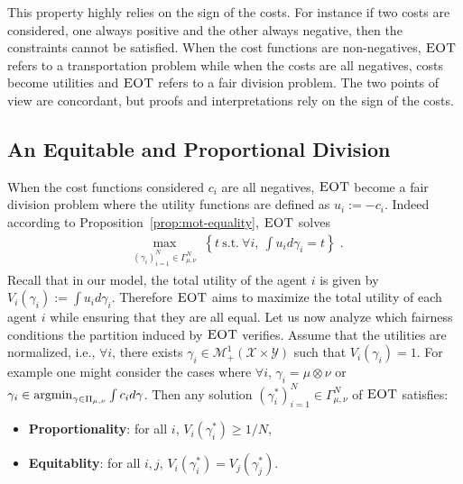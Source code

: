 This property highly relies on the sign of the costs. For instance if two costs are considered, one always positive and the other always negative, then the constraints cannot be satisfied. When the cost functions are non-negatives, $\textsc{EOT}$ refers to a transportation problem while when the costs are all negatives, costs become utilities and $\textsc{EOT}$ refers to a fair division problem. The two points of view are concordant, but proofs and interpretations rely on the sign of the costs.

\subsection{An Equitable and Proportional Division } 
When the cost functions considered $c_i$ are all negatives, $\textsc{EOT}$ become a fair division problem where the utility functions are defined as $u_i:=-c_i$. Indeed according to Proposition~\ref{prop:mot-equality}, $\textsc{EOT}$ solves
\begin{align*}
\max_{\substack{(\gamma_i)_{i=1}^N\in\Gamma^N_{\mu,\nu}
}}   \left\{t~\mathrm{s.t.}~ \forall i,~\int u_i d\gamma_i=t\right\}\; .
\end{align*}
Recall that in our model, the total utility of the agent $i$ is given by $V_i(\gamma_i):=\int u_i d\gamma_i$. Therefore $\textsc{EOT}$ aims to maximize the total utility of each agent $i$ while ensuring that they are all equal. Let us now analyze which fairness conditions the partition induced by $\textsc{EOT}$ verifies. Assume that the utilities are normalized, i.e., $\forall i$, there exists $\gamma_i\in\mathcal{M}_+^1(\mathcal{X}\times\mathcal{Y})$ such that $V_i(\gamma_i)=1$. For example one might consider the cases where $\forall i$,  $\gamma_i=\mu\otimes\nu$ or $\gamma_i\in\operatorname*{argmin}_{\gamma\in\Pi_{\mu,\nu}}  \int c_i d\gamma$. Then any solution $(\gamma_i^{*})_{i=1}^N\in\Gamma^N_{\mu,\nu}$ of $\textsc{EOT}$ satisfies:
\begin{itemize}
    \item \textbf{Proportionality}: for all $i$, $V_i(\gamma_i^{*})\geq 1/N$,
    \item \textbf{Equitablity}: for all $i,j$, $V_i(\gamma_i^{*})=V_j(\gamma_j^{*})$.

\end{itemize}
